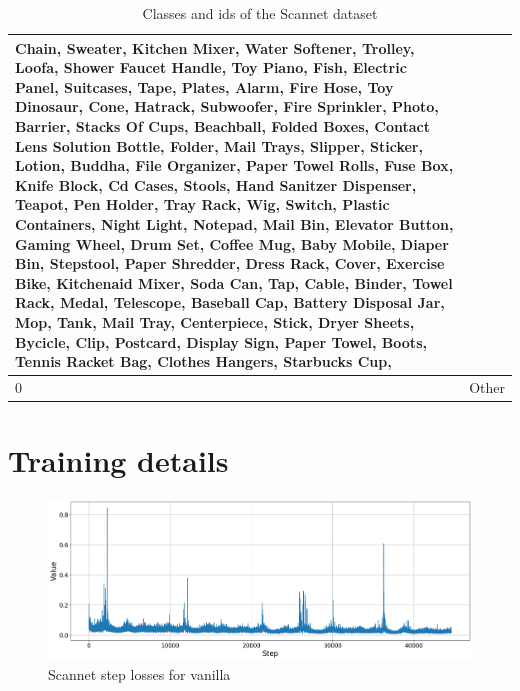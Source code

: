 \begin{table}
\begin{center}
\begin{tabular}{ | l | p{17cm} |}
Chain, Sweater, Kitchen Mixer, Water Softener, Trolley, Loofa, Shower Faucet Handle, Toy Piano, Fish, Electric Panel, Suitcases, Tape, Plates, Alarm, Fire Hose, Toy Dinosaur, Cone, Hatrack, Subwoofer, Fire Sprinkler, Photo, Barrier, Stacks Of Cups, Beachball, Folded Boxes, Contact Lens Solution Bottle, Folder, Mail Trays, Slipper, Sticker, Lotion, Buddha, File Organizer, Paper Towel Rolls, Fuse Box, Knife Block, Cd Cases, Stools, Hand Sanitzer Dispenser, Teapot, Pen Holder, Tray Rack, Wig, Switch, Plastic Containers, Night Light, Notepad, Mail Bin, Elevator Button, Gaming Wheel, Drum Set, Coffee Mug, Baby Mobile, Diaper Bin, Stepstool, Paper Shredder, Dress Rack, Cover, Exercise Bike, Kitchenaid Mixer, Soda Can, Tap, Cable, Binder, Towel Rack, Medal, Telescope, Baseball Cap, Battery Disposal Jar, Mop, Tank, Mail Tray, Centerpiece, Stick, Dryer Sheets, Bycicle, Clip, Postcard, Display Sign, Paper Towel, Boots, Tennis Racket Bag, Clothes Hangers, Starbucks Cup, \\ \hline
    			
    			0 & Other \\ \hline
    			\hline
    			
    			
    		\end{tabular}
    		\caption{Classes and ids of the Scannet dataset}
    		\label{table:Classes in scannet_3}
    	\end{center}
    \end{table}
	
	\chapter{Training details}
	
	\begin{figure}
		\centering
		\includegraphics[width=13cm]{images/scannet_step_vanilla_all.png}
		\caption{Scannet step losses for vanilla}
		\label{fig:android_result}
	\end{figure}

